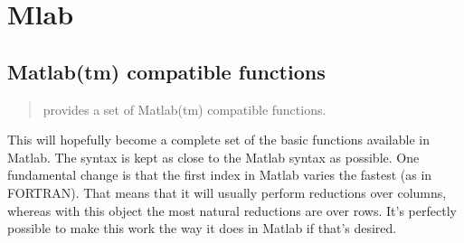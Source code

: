\chapter{Mlab}
\label{cha:mlab}

\makeatletter
\py@reset
\makeatother

\section{Matlab(tm) compatible functions}
\label{sec:Matlab-compatible-functions}

\begin{quote}
   provides a set of Matlab(tm) compatible functions.
\end{quote}

This will hopefully become a complete set of the basic functions available in
Matlab.  The syntax is kept as close to the Matlab syntax as possible.  One
fundamental change is that the first index in Matlab varies the fastest (as in
FORTRAN).  That means that it will usually perform reductions over columns,
whereas with this object the most natural reductions are over rows.  It's
perfectly possible to make this work the way it does in Matlab if that's
desired.

